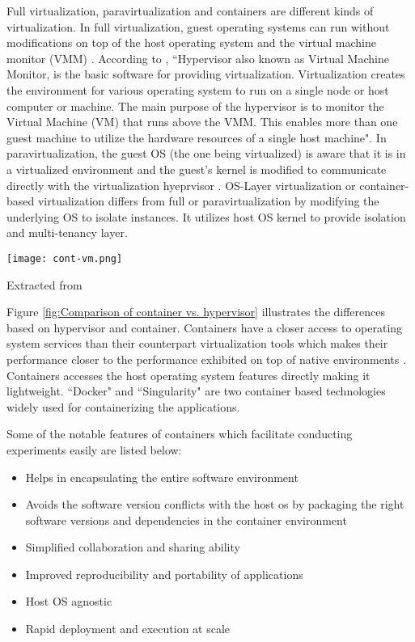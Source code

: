 Full virtualization, paravirtualization and containers are different kinds of virtualization. In full virtualization, guest operating systems can run without modifications on top of the host operating system and the virtual machine monitor (VMM) \cite{7382987}. According to \cite{hypervisor}, ``Hypervisor also known as Virtual Machine Monitor, is the basic software for providing virtualization. Virtualization creates the environment for various operating system to run on a single node or host computer or machine. The main purpose of the hypervisor is to monitor the Virtual Machine (VM) that runs above the VMM. This enables more than one guest machine to utilize the hardware resources of a single host machine". In paravirtualization, the guest OS (the one being virtualized) is aware that it is in a virtualized environment and the guest's kernel is modified to communicate directly with the virtualization hyeprvisor \cite{7382987}. OS-Layer virtualization or container-based virtualization differs from full or paravirtualization by modifying the underlying OS to isolate instances. It utilizes host OS kernel to provide isolation and multi-tenancy layer.

\begin{center}
\texttt{[image: cont-vm.png]}
\label{fig:Comparison of container vs. hypervisor}
\caption*{Extracted from \cite{7382987}}
\end{center}

Figure \ref{fig:Comparison of container vs. hypervisor} illustrates the differences based on hypervisor and container. Containers have a closer access to operating system services than their counterpart virtualization tools which makes their performance closer to the performance exhibited on top of native environments \cite{Xavier:2013:PEC:2497369.2497577}. Containers accesses the host operating system features directly making it lightweight. ``Docker" and ``Singularity" are two container based technologies widely used for containerizing the applications.

Some of the notable features of containers \cite{docker-run} \cite{DBLP:journals/corr/HaleLRW16} \cite{Julian:2016:CRI:2949550.2949562} \cite{10.1109/ISPASS.2015.7095802} which facilitate conducting experiments easily are listed below:

\begin{itemize}
  \item Helps in encapsulating the entire software environment
  \item Avoids the software version conflicts with the host os by packaging the right software versions and dependencies in the container environment
  \item Simplified collaboration and sharing ability
  \item Improved reproducibility and portability of applications
  \item Host OS agnostic
  \item Rapid deployment and execution at scale
\end{itemize}


